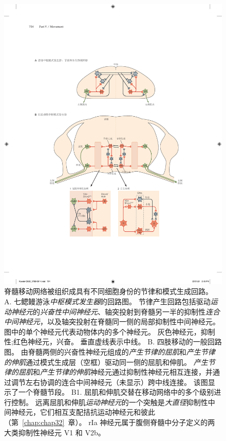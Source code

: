 \begin{figure}[htbp]
	\centering
	\includegraphics[width=0.94\linewidth]{chap33/fig_33_7}
	\caption{脊髓移动网络被组织成具有不同细胞身份的节律和模式生成回路。
	A. 七鳃鳗游泳\textit{中枢模式发生器}的回路图。
	节律产生回路包括驱动\textit{运动神经元}的\textit{兴奋性中间神经元}、轴突投射到脊髓另一半的抑制性\textit{连合中间神经元}，以及轴突投射在脊髓同一侧的局部抑制性中间神经元。
	图中的单个神经元代表动物体内的多个神经元。
	灰色神经元，抑制性;红色神经元，兴奋。
	垂直虚线表示中线\cite{grillner2006biological}。
	B. 四肢移动的一般回路图。
	由脊髓两侧的兴奋性神经元组成的\textit{产生节律的屈肌}和\textit{产生节律的伸肌}通过模式生成层（空框）驱动同一侧的屈肌和伸肌。
	\textit{产生节律的屈肌}和\textit{产生节律的伸肌}神经元通过抑制性神经元相互连接，并通过调节左右协调的连合中间神经元（未显示）跨中线连接。
	该图显示了一个脊髓节段\cite{kiehn2016decoding}。
	B1. 屈肌和伸肌交替在移动网络中的多个级别进行控制。
	远离屈肌和伸肌\textit{运动神经元}的一个突触是\textit{大直径}抑制性中间神经元，它们相互支配拮抗运动神经元和彼此（第~\ref{chap:chap32}~章）。
	rIa 神经元属于腹侧脊髓中分子定义的两大类抑制性神经元 V1 和 V2b。
}
\end{figure}

